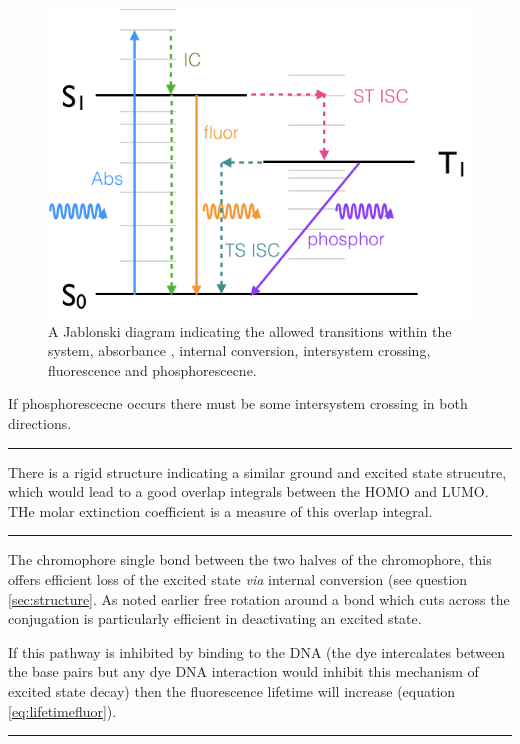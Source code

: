 \documentclass[
]{book}
\begin{document}
\begin{figure}

{\centering \includegraphics[width=0.6\linewidth]{images/Jablonski} 

}

\caption{A Jablonski diagram indicating the allowed transitions within the system, absorbance , internal conversion, intersystem crossing, fluorescence and phosphorescecne.}\label{fig:Jablonski2}
\end{figure}

If phosphorescecne occurs there must be some intersystem crossing in both directions.

\begin{center}\rule{0.5\linewidth}{0.5pt}\end{center}

There is a rigid structure indicating a similar ground and excited state strucutre, which would lead to a good overlap integrals between the HOMO and LUMO. THe molar extinction coefficient is a measure of this overlap integral.

\begin{center}\rule{0.5\linewidth}{0.5pt}\end{center}

The chromophore single bond between the two halves of the chromophore, this offers efficient loss of the excited state \emph{via} internal conversion (see question \ref{sec:structure}. As noted earlier free rotation around a bond which cuts across the conjugation is particularly efficient in deactivating an excited state.

If this pathway is inhibited by binding to the DNA (the dye intercalates between the base pairs but any dye DNA interaction would inhibit this mechanism of excited state decay) then the fluorescence lifetime will increase (equation \eqref{eq:lifetimefluor}).

\begin{center}\rule{0.5\linewidth}{0.5pt}\end{center}
\end{document}
